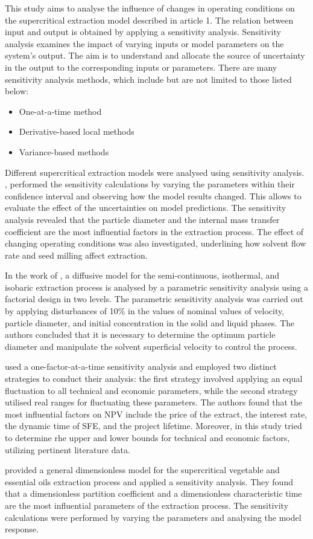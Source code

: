\documentclass[../Article_Sensitivity_Analsysis.tex]{subfiles}
\begin{document}
	
	This study aims to analyse the influence of changes in operating conditions on the supercritical extraction model described in {\color{red}article 1}. The relation between input and output is obtained by applying a sensitivity analysis. Sensitivity analysis examines the impact of varying inputs or model parameters on the system's output. The aim is to understand and allocate the source of uncertainty in the output to the corresponding inputs or parameters. There are many sensitivity analysis methods, which include but are not limited to those listed below:
	
	\begin{itemize}
		\item One-at-a-time method
		\item Derivative-based local methods
		\item Variance-based methods
	\end{itemize}
	
	Different supercritical extraction models were analysed using sensitivity analysis. \citet{Fiori_2007}, performed the sensitivity calculations by varying the parameters within their confidence interval and observing how the model results changed. This allows to evaluate the effect of the uncertainties on model predictions. The sensitivity analysis revealed that the particle diameter and the internal mass transfer coefficient are the most influential factors in the extraction process. The effect of changing operating conditions was also investigated, underlining how solvent flow rate and seed milling affect extraction.
	
	In the work of \citet{Santos2000}, a diffusive model for the semi-continuous, isothermal, and isobaric extraction process is analysed by a parametric sensitivity analysis using a factorial design in two levels. The parametric sensitivity analysis was carried out by applying disturbances of 10\% in the values of nominal values of velocity, particle diameter, and initial concentration in the solid and liquid phases. The authors concluded that it is necessary to determine the optimum particle diameter and manipulate the solvent superficial velocity to control the process.
	
	\citet{Hatami2024} used a one-factor-at-a-time sensitivity analysis and employed two distinct strategies to conduct their analysis: the first strategy involved applying an equal fluctuation to all technical and economic parameters, while the second strategy utilised real ranges for fluctuating these parameters. The authors found that the most influential factors on NPV include the price of the extract, the interest rate, the dynamic time of SFE, and the project lifetime. Moreover, in this study tried to determine rhe upper and lower bounds for technical and economic factors, utilizing pertinent literature data. 
	
	\citet{Poletto1996} provided a general dimensionless model for the supercritical vegetable and essential oils extraction process and applied a sensitivity analysis. They found that a dimensionless partition coefficient and a dimensionless characteristic time are the most influential parameters of the extraction process. The sensitivity calculations were performed by varying the parameters and analysing the model response.
	
\end{document}
